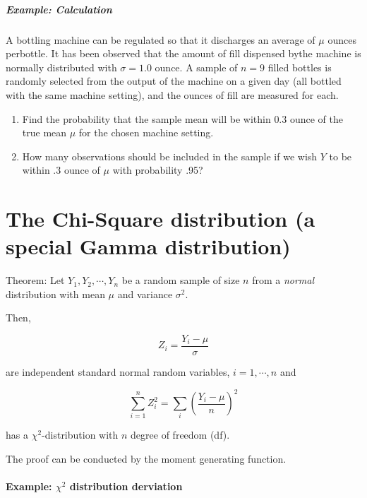\documentclass[
  letterpaper,
  DIV=11,
  numbers=noendperiod]{scrreprt}
\let\oldparagraph\paragraph
\renewcommand{\paragraph}[1]{\oldparagraph{#1}\mbox{}}
\let\oldsubparagraph\subparagraph
\renewcommand{\subparagraph}[1]{\oldsubparagraph{#1}\mbox{}}
\theoremstyle{plain}
\theoremstyle{remark}
\begin{document}
\hypertarget{example-calculation}{%
\subparagraph{Example: Calculation}\label{example-calculation}}

A bottling machine can be regulated so that it discharges an average of
\(\mu\) ounces perbottle. It has been observed that the amount of fill
dispensed bythe machine is normally distributed with \(\sigma = 1.0\)
ounce. A sample of \(n = 9\) filled bottles is randomly selected from
the output of the machine on a given day (all bottled with the same
machine setting), and the ounces of fill are measured for each.

\begin{enumerate}
\def\labelenumi{(\alph{enumi})}
\item
  Find the probability that the sample mean will be within \(0.3\) ounce
  of the true mean \(\mu\) for the chosen machine setting.
\item
  How many observations should be included in the sample if we wish
  \(Y\) to be within .3 ounce of \(\mu\) with probability .95?
\end{enumerate}

\hypertarget{the-chi-square-distribution-a-special-gamma-distribution}{%
\section{The Chi-Square distribution (a special Gamma
distribution)}\label{the-chi-square-distribution-a-special-gamma-distribution}}

Theorem: Let \(Y_1, Y_2, \cdots, Y_n\) be a random sample of size \(n\)
from a \emph{normal} distribution with mean \(\mu\) and variance
\(\sigma^2\).

Then,

\[
 Z_i=\frac{Y_i-\mu}{\sigma} 
\]

are independent standard normal random variables, \(i=1,\cdots,n\) and

\[
\sum_{i=1}^n Z_i^2=\sum_{i}\left(\frac{Y_i-\mu}{n}\right)^2
\]

has a \(\chi^2\)-distribution with \(n\) degree of freedom (df).

The proof can be conducted by the moment generating function.

\hypertarget{example-chi2-distribution-derviation}{%
\paragraph{\texorpdfstring{Example: \(\chi^2\) distribution
derviation}{Example: \textbackslash chi\^{}2 distribution derviation}}\label{example-chi2-distribution-derviation}}
\end{document}
